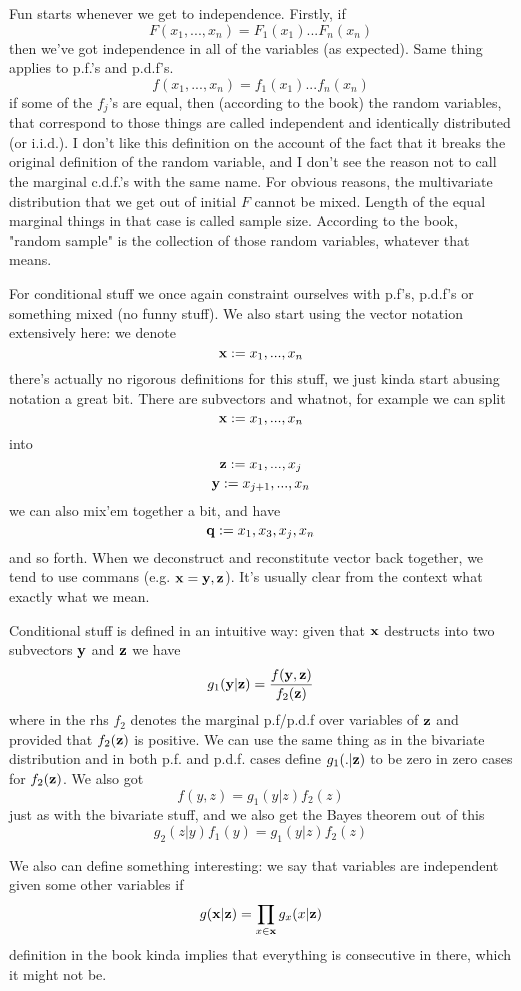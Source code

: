 \documentclass[11pt,oneside,titlepage]{book}
\begin{document}
Fun starts whenever we get to independence. Firstly, if
$$F(x_1, ..., x_n) = F_1(x_1)...F_n(x_n)$$
then we've got independence in all of the variables (as expected).
Same thing applies to p.f.'s and p.d.f's.
$$f(x_1, ..., x_n) = f_1(x_1)...f_n(x_n)$$
if some of the  $f_j$'s are equal, then
(according to the book) the random variables, that correspond to those
things are called independent and identically distributed (or i.i.d.).
I don't like this definition on the account of the fact that it breaks
the original definition of the random variable, and I don't see the
reason not to call the marginal c.d.f.'s with the same name.
For obvious reasons, the multivariate distribution that we get out of
initial $F$ cannot be mixed. Length of the equal marginal things in
that case is called sample size. According to the book, "random
sample" is the collection of those random variables, whatever that
means.

For conditional stuff we once again constraint ourselves with p.f's,
p.d.f's or something mixed (no funny stuff). We also start using the vector
notation extensively here: we denote
$$\bold x  := x_1, ..., x_n$$
there's actually no rigorous definitions for this stuff, we just kinda
start abusing notation a great bit.
There are subvectors and whatnot, for example we can split
$$\bold x  := x_1, ..., x_n$$
into
$$\bold z  := x_1, ..., x_j$$
$$\bold y  := x_{j + 1}, ..., x_n$$
we can also mix'em together a bit, and have
$$\bold q := x_1, x_3, x_j, x_n$$
and so forth. When we deconstruct and reconstitute vector back
together, we tend to use commans (e.g. $\bold x = \bold y, \bold
z$). It's usually clear from the context what exactly what we mean.

Conditional stuff is defined in an intuitive way: given that $\bold x$
destructs into two subvectors $\bold y$ and $\bold z$ we have
$$g_1(\bold y | \bold z) = \frac{f(\bold y, \bold z)}{f_2(\bold z)}$$
where in the rhs $f_2$ denotes the marginal p.f/p.d.f over variables
of $\bold z$ and provided that $f_2(\bold z)$ is positive. We can use
the same thing as in the bivariate distribution and in both p.f. and
p.d.f. cases define $g_1(. | \bold z)$ to be zero in zero cases for
$f_2(\bold z)$. We also got
$$f(y, z) = g_1(y| z) f_2(z)$$
just as with the bivariate stuff, and we also get the Bayes theorem
out of this
$$g_2(z| y) f_1(y)= g_1(y| z) f_2(z)$$

We also can define something interesting: we say that variables are independent
given some other variables if
$$g(\bold x | \bold z) = \prod_{x \in \bold x}{g_x(x|\bold z)}$$
definition in the book kinda implies that everything is consecutive in
there, which it might not be.
\end{document}
